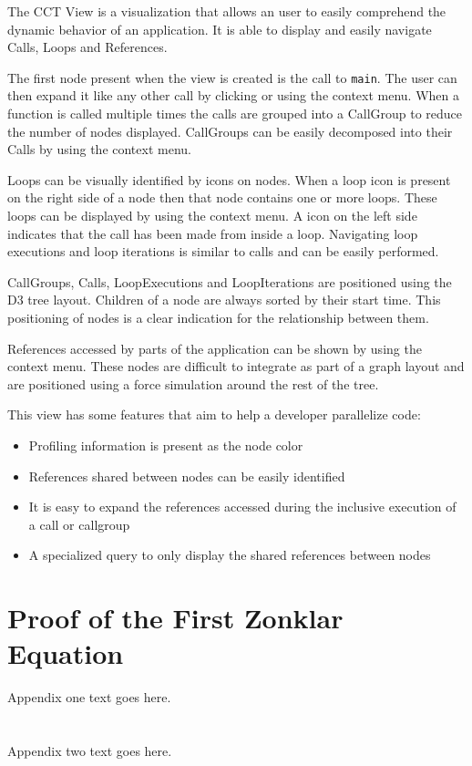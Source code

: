\documentclass[conference]{IEEEtran}
\begin{document}
The CCT View is a visualization that allows an user to easily comprehend the dynamic behavior of an application. It is able to display and easily navigate Calls, Loops and References.

The first node present when the view is created is the call to \texttt{main}. The user can then expand it like any other call by clicking or using the context menu. When a function is called multiple times the calls are grouped into a CallGroup to reduce the number of nodes displayed. CallGroups can be easily decomposed into their Calls by using the context menu.

Loops can be visually identified by icons on nodes. When a loop icon is present on the right side of a node then that node contains one or more loops. These loops can be displayed by using the context menu. A icon on the left side indicates that the call has been made from inside a loop. Navigating loop executions and loop iterations is similar to calls and can be easily performed.

CallGroups, Calls, LoopExecutions and LoopIterations are positioned using the D3 tree layout. Children of a node are always sorted by their start time. This positioning of nodes is a clear indication for the relationship between them.

References accessed by parts of the application can be shown by using the context menu. These nodes are difficult to integrate as part of a graph layout and are positioned using a force simulation around the rest of the tree.

This view has some features that aim to help a developer parallelize code:

\begin{itemize}
	\item Profiling information is present as the node color
	\item References shared between nodes can be easily identified
	\item It is easy to expand the references accessed during the inclusive execution of a call or callgroup
	\item A specialized query to only display the shared references between nodes
\end{itemize}

\appendices
\section{Proof of the First Zonklar Equation}
Appendix one text goes here.

\section{}
Appendix two text goes here.

\ifCLASSOPTIONcaptionsoff
  \newpage
\fi
\end{document}
